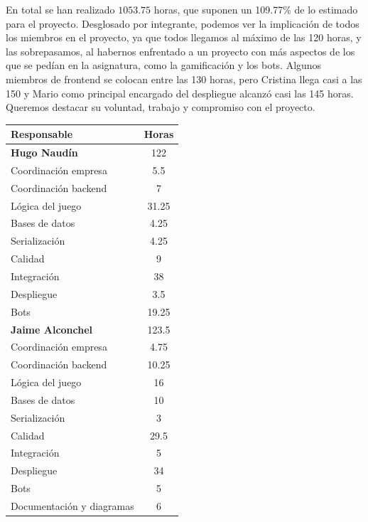 \documentclass[11pt]{article}
\begin{document}
En total se han realizado $1053.75$ horas, que suponen un 109.77\% de lo
estimado para el proyecto. 
Desglosado por integrante, podemos ver la implicación de todos los miembros en
el proyecto, ya que todos llegamos al máximo de las 120 horas, y las sobrepasamos,
al habernos enfrentado a un proyecto con más aspectos de los que se pedían en la
asignatura, como la gamificación y los bots. 
Algunos miembros de frontend se colocan entre las 130 horas, pero 
Cristina llega casi a las 150 y 
Mario como principal encargado del despliegue alcanzó casi las 145 horas. 
Queremos destacar su voluntad, trabajo y compromiso con el proyecto.

\begin{center}
		\begin{longtable}{|l|S[table-format=3.2]|}
				\hline
				Responsable & Horas \\
				\hline
				\endhead
				\hline
				\textbf{Hugo Naudín} & 122 \\
				\hline
				Coordinación empresa & 5.5 \\
				\hline
				Coordinación backend & 7 \\
				\hline 
				Lógica del juego & 31.25 \\
				\hline 
				Bases de datos & 4.25 \\
				\hline 
				Serialización & 4.25 \\
				\hline
				Calidad & 9 \\ 
				\hline 
				Integración & 38 \\
				\hline
				Despliegue & 3.5 \\
				\hline
				Bots & 19.25 \\
				\hline
				\hline 
				\textbf{Jaime Alconchel} & 123.5 \\
				\hline
				Coordinación empresa & 4.75 \\
				\hline
				Coordinación backend & 10.25 \\
				\hline 
				Lógica del juego & 16 \\
				\hline 
				Bases de datos & 10 \\
				\hline 
				Serialización & 3 \\ 
				\hline 
				Calidad & 29.5 \\
				\hline 
				Integración & 5 \\
				\hline 
				Despliegue & 34 \\
				\hline 
				Bots & 5 \\
				\hline
				Documentación y diagramas & 6 \\

\end{longtable}
\end{center}
\end{document}
